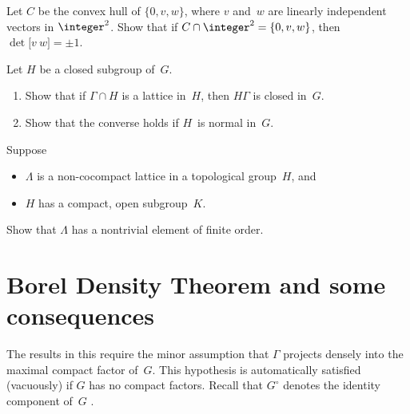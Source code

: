 \begin{exercises}
 \item \label{DetOne}
 Let $C$ be the convex hull of $\{0,v,w\}$, where $v$ and~$w$ are linearly independent vectors in $\integer^2$. Show that if $C \cap \integer^2 = \{0,v,w\}$, then $\det \bigl[ v \  w \bigr] = \pm 1$.
 
\item \label{NGammaclosed}
 Let $H$ be a closed subgroup of~$G$. 
 	\begin{enumerate}
	\item \label{NGammaclosed-closed}
	Show that if $\Gamma \cap H$ is a lattice in~$H$, then $H \Gamma$ is
closed in~$G$.
	\item \label{NGammaclosed-converse}
	Show that the converse holds if $H$~is normal in~$G$.
	\end{enumerate}

\item \label{CpctOpenSubgrp->LattsCocpct}
Suppose 
	\begin{itemize}
	\item $\Lambda$ is a non-cocompact lattice in a topological group~$H$,
	and
	\item $H$ has a compact, open subgroup~$K$.
	\end{itemize}
Show that $\Lambda$ has a nontrivial element of finite order.

\end{exercises}



\section{Borel Density Theorem and some consequences}
\label{BDTSect}

The results in this  require the minor assumption that $\Gamma$ projects densely into the maximal compact factor of~$G$. This hypothesis is automatically satisfied (vacuously) if $G$ has no compact factors.
Recall that $G^\circ$ denotes the identity component of~$G$ .

